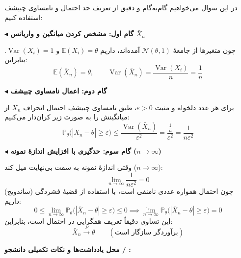\documentclass[12pt,a4paper,oneside]{report}
\newcommand{\step}[1]{\par\smallskip\noindent\textbf{\color{stepcolor}$\blacktriangleleft$ #1}\par\smallskip}
\newcommand{\notespace}{%
  \par\vspace{8pt}%
  \begin{tcolorbox}[breakable=false,colback=white,colframe=muted!50,boxrule=.6pt,arc=1.5mm,height=0.36\textheight]
    \textcolor{muted!70}{\small\textbf{محل یادداشت‌ها و نکات تکمیلی دانشجو / \lr{TA}:}}
  \end{tcolorbox}%
  \par\vspace{8pt}%
}
\newcommand{\E}{\mathbb E}
\newcommand{\Var}{\operatorname{Var}}
\newcommand{\Prob}{\mathbb P}
\begin{document}
\begin{solutionbox}
در این سوال می‌خواهیم گام‌به‌گام و دقیق از تعریف حد احتمال و نامساوی چبیشف استفاده کنیم:

\step{گام اول: مشخص کردن میانگین و واریانس $\bar{X}_n$}
چون متغیرها از جامعهٔ $\mathcal{N}(\theta, 1)$ آمده‌اند، داریم $\E(X_i) = \theta$ و $\Var(X_i) = 1$. بنابراین:
\[
\E(\bar{X}_n) = \theta, \qquad \Var(\bar{X}_n) = \frac{\Var(X_i)}{n} = \frac{1}{n}
\]

\step{گام دوم: اعمال نامساوی چبیشف}
برای هر عدد دلخواه و مثبت $\varepsilon > 0$، طبق نامساوی چبیشف احتمال انحراف $\bar{X}_n$ از میانگینش را به صورت زیر کران‌دار می‌کنیم:
\[
\Prob_\theta\big(|\bar{X}_n - \theta| \ge \varepsilon\big) \le \frac{\Var(\bar{X}_n)}{\varepsilon^2} = \frac{\frac{1}{n}}{\varepsilon^2} = \frac{1}{n\varepsilon^2}
\]

\step{گام سوم: حدگیری با افزایش اندازهٔ نمونه ($n \to \infty$)}
وقتی اندازهٔ نمونه به سمت بی‌نهایت میل کند ($n \to \infty$):
\[
\lim_{n \to \infty} \frac{1}{n\varepsilon^2} = 0
\]
چون احتمال همواره عددی نامنفی است، با استفاده از قضیهٔ فشردگی (ساندویچ) داریم:
\[
0 \le \lim_{n \to \infty} \Prob_\theta\big(|\bar{X}_n - \theta| \ge \varepsilon\big) \le 0 \implies \lim_{n \to \infty} \Prob_\theta\big(|\bar{X}_n - \theta| \ge \varepsilon\big) = 0
\]
این تساوی دقیقاً تعریف همگرایی در احتمال است، بنابراین:
\[
\boxed{\bar{X}_n \xrightarrow{\;P\;} \theta \qquad (\text{برآوردگر سازگار است})}
\]
\end{solutionbox}

\notespace
\end{document}
